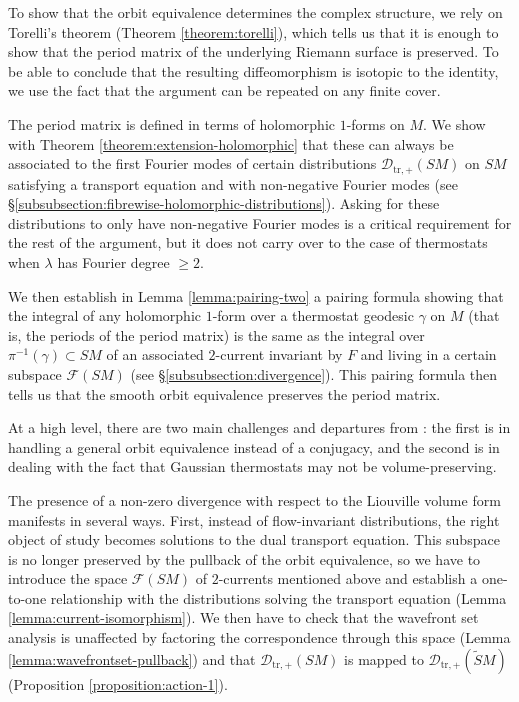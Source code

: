\documentclass[reqno,12pt,letterpaper]{amsart}
\theoremstyle{definition}
\theoremstyle{remark}
\theoremstyle{definition}
\numberwithin{equation}{section}
\begin{document}
To show that the orbit equivalence determines the complex structure, we rely on Torelli's theorem (Theorem \ref{theorem:torelli}), which tells us that it is enough to show that the period matrix of the underlying Riemann surface is preserved. To be able to conclude that the resulting diffeomorphism is isotopic to the identity, we use the fact that the argument can be repeated on any finite cover. 

The period matrix is defined in terms of holomorphic $1$-forms on $M$. We show with Theorem \ref{theorem:extension-holomorphic} that these can always be associated to the first Fourier modes of certain distributions $\mathcal{D}_{\text{tr},+}(SM)$ on $SM$ satisfying a transport equation and with non-negative Fourier modes (see \S\ref{subsubsection:fibrewise-holomorphic-distributions}). Asking for these distributions to only have  non-negative Fourier modes is a critical requirement for the rest of the argument, but it does not carry over to the case of thermostats when $\lambda$ has Fourier degree $\geq 2$.

We then establish in Lemma \ref{lemma:pairing-two} a pairing formula showing that the integral of any holomorphic $1$-form over a thermostat geodesic $\gamma$ on $M$ (that is, the periods of the period matrix) is the same as the integral over $\pi^{-1}(\gamma)\subset SM$ of an associated $2$-current  invariant by $F$ and living in a certain subspace $\mathcal{F}(SM)$ (see \S\ref{subsubsection:divergence}). This pairing formula then tells us that the smooth orbit equivalence preserves the period matrix.

At a high level, there are two main challenges and departures from \cite{guillarmou25}: the first is in handling a general orbit equivalence instead of a conjugacy, and the second is in dealing with the fact that Gaussian thermostats may not be volume-preserving.

The presence of a non-zero divergence with respect to the Liouville volume form manifests in several ways. First, instead of flow-invariant distributions, the right object of study becomes solutions to the dual transport equation. This subspace is no longer preserved by the pullback of the orbit equivalence, so we have to introduce the space $\mathcal{F}(SM)$ of  $2$-currents mentioned above and establish a one-to-one relationship with the distributions solving the transport equation (Lemma \ref{lemma:current-isomorphism}). We then have to check that the wavefront set analysis is unaffected by factoring the correspondence through this space (Lemma \ref{lemma:wavefrontset-pullback}) and that $\mathcal{D}_{\text{tr},+}(SM)$ is mapped to  $\mathcal{D}_{\text{tr},+}(\widetilde{S}M)$ (Proposition \ref{proposition:action-1}). 
 
\end{document}
